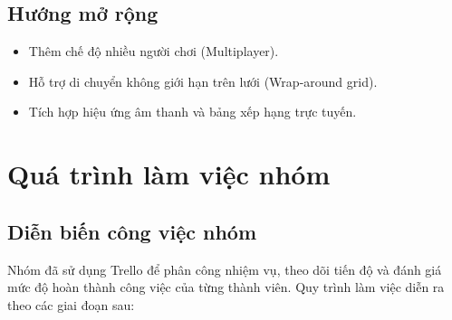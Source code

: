 \documentclass[a4paper, 12pt]{article}
\begin{document}
\subsection{Hướng mở rộng}
\begin{itemize}
    \item Thêm chế độ nhiều người chơi (Multiplayer).
    \item Hỗ trợ di chuyển không giới hạn trên lưới (Wrap-around grid).
    \item Tích hợp hiệu ứng âm thanh và bảng xếp hạng trực tuyến.
\end{itemize}

\newpage
\section{Quá trình làm việc nhóm}

\subsection{Diễn biến công việc nhóm}
Nhóm đã sử dụng Trello để phân công nhiệm vụ, theo dõi tiến độ và đánh giá mức độ hoàn thành công việc của từng thành viên. Quy trình làm việc diễn ra theo các giai đoạn sau:
\end{document}
